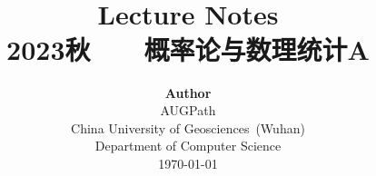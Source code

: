 \title{ \normalsize \textsc{}
		\\ [2.0cm]
		\HRule{1.5pt} \\
		\LARGE \textbf{{Lecture Notes}
		\HRule{2.0pt} \\ [0.6cm] \LARGE{2023秋 ~~~概率论与数理统计A} \vspace*{10\baselineskip}}
		}
\date{}
\author{\textbf{Author} \\ 
		AUGPath \\
		China University of Geosciences~(Wuhan) \\
		Department of Computer Science \\
		\today}

\maketitle
\newpage
\setcounter{tocdepth}{1}
\tableofcontents
\newpage
